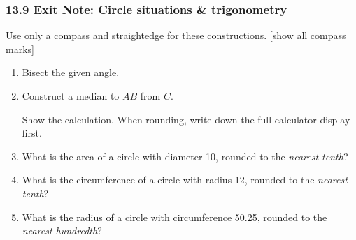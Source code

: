 \documentclass[12pt, twoside]{article}
\begin{document}
\subsubsection*{13.9 Exit Note: Circle situations \& trigonometry}
 Use only a compass and straightedge for these constructions. [show all compass marks]
   \begin{enumerate}

   \item Bisect the given angle. \vspace{1cm}
     \begin{center}
   \end{center} \vspace{0.5cm}

   \item Construct a median to $\overline{AB}$ from $C$.\\
     \vspace{1cm}
     \begin{center}
   \end{center}

 \newpage
 Show the calculation. When rounding, write down the full calculator display first.
    \item What is the area of a circle with diameter 10, rounded to the \emph{nearest tenth}? \vspace{2.5cm}
    \item What is the circumference of a circle with radius 12, rounded to the \emph{nearest tenth}? \vspace{2.5cm}
    \item What is the radius of a circle with circumference 50.25, rounded to the \emph{nearest hundredth}? \vspace{4cm}


\end{enumerate}
\end{document}
